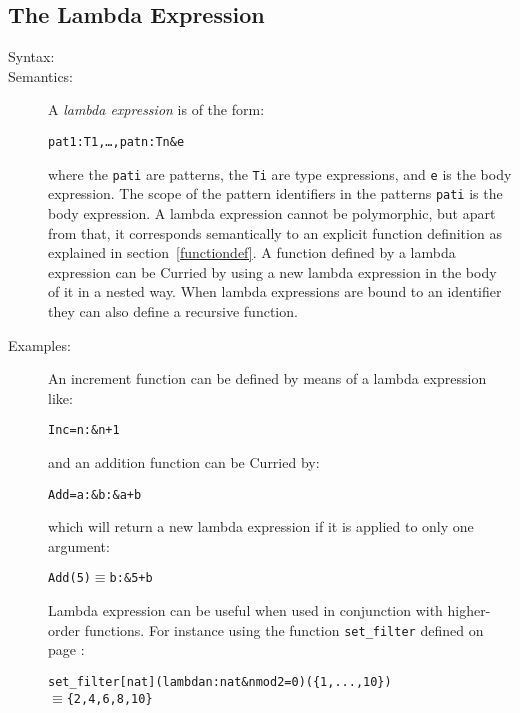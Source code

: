 \documentclass[\pformat,12pt]{article}
\newcommand{\MYEQUIV}{$\equiv$}
\begin{document}
\subsection{The Lambda Expression}\label{lambda}

\begin{description}
\item[Syntax:]



        
\item[Semantics:] A {\it lambda expression} is of the form:
  \begin{alltt}
     pat1 : T1, \ldots, patn : Tn \& e
  \end{alltt}
  where the {\tt pati} are patterns, the {\tt Ti} are type expressions, and
  {\tt e} is the body expression. The scope of the pattern identifiers in
  the patterns {\tt pati} is the body expression. A lambda expression
  cannot be polymorphic, but apart from that, it corresponds semantically
  to an explicit function definition as explained in
  section~\ref{functiondef}. A function defined by a lambda expression can
  be Curried by using a new lambda expression in the body of it in a nested
  way. When lambda expressions are bound to an identifier they can also
  define a recursive function.

\item[Examples:] An increment function can be defined by means of a lambda
  expression like:
  \begin{alltt}
    Inc =  n :  \& n + 1
  \end{alltt}
  and an addition function can be Curried by:
  \begin{alltt}
    Add =  a :  \&  b :  \& a + b
  \end{alltt}
  which will return a new lambda expression if it is applied to only one
  argument:
  \begin{alltt}
    Add(5) \(\equiv\)  b :  \& 5 + b
  \end{alltt}
  Lambda expression can be useful when used in conjunction with higher-order 
  functions. For instance using the function \texttt{set\_filter}
  defined on page \pageref{setfilterdef}:
  \begin{alltt}
  set_filter[nat](lambda n:nat & n mod 2 = 0)(\{1,...,10\})
  \MYEQUIV \{2,4,6,8,10\}
  \end{alltt}
\end{description}
\end{document}
